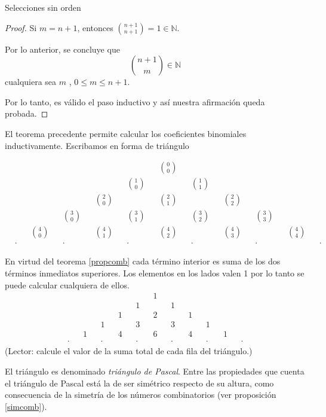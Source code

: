 \documentclass[11pt,spanish,makeidx]{amsbook}
\theoremstyle{definition}
\theoremstyle{remark}
\begin{document}
\begin{section}{Selecciones sin orden}
\begin{proof}
Si $m = n+1$, entonces $\binom{n+1}{n+1} = 1  \in \mathbb N$.

Por lo anterior, se concluye que
$$
\binom{n+1}{m}   \in \mathbb N
$$
cualquiera sea $m$ , $0 \le m \le n + 1$.

Por lo tanto, es válido el paso inductivo y así nuestra afirmación queda probada.
\end{proof}

El teorema precedente permite calcular los coeficientes binomiales inductivamente. Escribamos en forma de triángulo

\begin{align*}
&& && && && && &\binom{0}{0}& && && && && &&  \\
&& && && && &\binom{1}{0}& && &\binom{1}{1}& && && && &&  \\
&& && && &\binom{2}{0}& && &\binom{2}{1}& && &\binom{2}{2}& && && &&  \\
&& && &\binom{3}{0}& && &\binom{3}{1}& && &\binom{3}{2}& && &\binom{3}{3}& && &&  \\
&& &\binom{4}{0}& && &\binom{4}{1}& && &\binom{4}{2}& && &\binom{4}{3}& && &\binom{4}{4}& &&  \\
&\cdot& && &\cdot& && &\cdot& && &\cdot& && &\cdot& && &\cdot& 
\end{align*}

En virtud del teorema \ref{propcomb} cada término interior es suma de los dos términos inmediatos superiores. Los elementos en los lados valen 1 por lo tanto se puede calcular cualquiera
de ellos.
\begin{align*}
&& && && && && &1& && && && && &&  \\
&& && && && &1& && &1& && && && &&  \\
&& && && &1& && &2& && &1& && && &&  \\
&& && &1& && &3& && &3& && &1& && &&  \\
&& &1& && &4& && &6& && &4& && &1& &&  \\
&\cdot& && &\cdot& && &\cdot& && &\cdot& && &\cdot& && &\cdot& 
\end{align*}
(Lector: calcule el valor de la suma total de cada fila del triángulo.)

El  triángulo es denominado \emph{triángulo de Pascal}. Entre las propiedades que cuenta el triángulo de Pascal está la de ser simétrico respecto de su altura, como consecuencia de la simetría de los números combinatorios (ver proposición \ref{simcomb}). 

\end{section}
\end{document}
